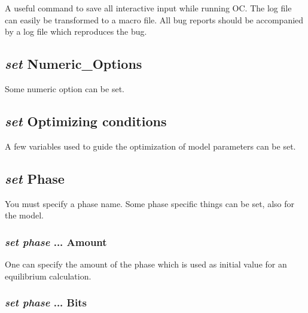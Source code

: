 \documentclass[12pt]{article}
\begin{document}
A useful command to save all interactive input while running OC.  The
log file can easily be transformed to a macro file.  All bug reports
should be accompanied by a log file which reproduces the bug.

\subsection{{\em set} Numeric\_Options}

Some numeric option can be set.

\subsection{{\em set} Optimizing conditions}

A few variables used to guide the optimization of model parameters can
be set.

\subsection{{\em set} Phase}

You must specify a phase name.  Some phase specific things can be set,
also for the model.

\subsubsection{{\em set phase} ... Amount}

One can specify the amount of the phase which is used as initial value
for an equilibrium calculation.

\subsubsection{{\em set phase} ... Bits}
\end{document}
